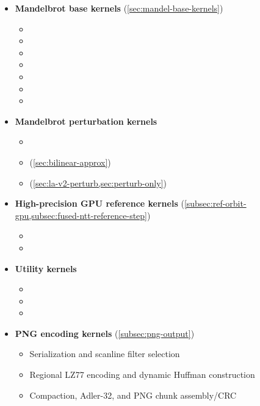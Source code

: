 \begin{itemize}

\item \textbf{Mandelbrot base kernels} (\cref{sec:mandel-base-kernels})
  \begin{itemize}
    \item {}
    \item {}
    \item {}
    \item {}
    \item {}
    \item {}
    \item {}
  \end{itemize}

\item \textbf{Mandelbrot perturbation kernels}
  \begin{itemize}
    \item {}
    \item {} (\cref{sec:bilinear-approx})
    \item {} (\cref{sec:la-v2-perturb,sec:perturb-only})
  \end{itemize}

\item \textbf{High-precision GPU reference kernels}
  (\cref{subsec:ref-orbit-gpu,subsec:fused-ntt-reference-step})
  \begin{itemize}
    \item {}
    \item {}
  \end{itemize}

\item \textbf{Utility kernels}
  \begin{itemize}
    \item {}
    \item {}
    \item {}
  \end{itemize}

\item \textbf{PNG encoding kernels} (\cref{subsec:png-output})
  \begin{itemize}
    \item Serialization and scanline filter selection
    \item Regional LZ77 encoding and dynamic Huffman construction
    \item Compaction, Adler-32, and PNG chunk assembly/CRC
  \end{itemize}


\end{itemize}
